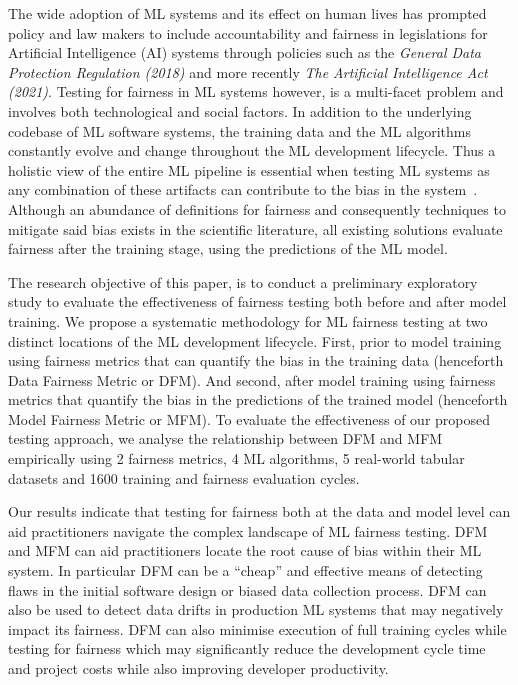 \documentclass{article}
\begin{document}
The wide adoption of ML systems and its effect on human lives has
prompted policy and law makers to include accountability and fairness
in legislations for Artificial Intelligence (AI) systems through
policies such as the \emph{General Data Protection Regulation (2018)}
and more recently \emph{The Artificial Intelligence Act
(2021)}. Testing for fairness in ML systems however, is a multi-facet
problem and involves both technological and social factors. In
addition to the underlying codebase of ML software systems, the
training data and the ML algorithms constantly evolve and change
throughout the ML development lifecycle. Thus a holistic view of the
entire ML pipeline is essential when testing ML systems as any
combination of these artifacts can contribute to the bias in the
system \cite{sculley2015hidden,bosch2021engineering,hutchinson2021towards,sato2019continuous}. Although
an abundance of definitions for fairness and consequently techniques
to mitigate said bias exists in the scientific literature, all
existing solutions evaluate fairness after the training stage, using
the predictions of the ML model.

The research objective of this paper, is to conduct a preliminary
exploratory study to evaluate the effectiveness of fairness testing
both before and after model training. We propose a systematic
methodology for ML fairness testing at two distinct locations of the
ML development lifecycle. First, prior to model training using
fairness metrics that can quantify the bias in the training data
(henceforth Data Fairness Metric or DFM). And second, after model
training using fairness metrics that quantify the bias in the
predictions of the trained model (henceforth Model Fairness Metric or
MFM). To evaluate the effectiveness of our proposed testing approach,
we analyse the relationship between DFM and MFM empirically using
2 fairness metrics, 4 ML algorithms, 5 real-world tabular datasets and
  1600 training and fairness evaluation cycles.

Our results indicate that testing for fairness both at the data and
model level can aid practitioners navigate the complex landscape of ML
fairness testing. DFM and MFM can aid practitioners locate the root
cause of bias within their ML system. In particular DFM can be
a ``cheap'' and effective means of detecting flaws in the initial
software design or biased data collection process. DFM can also be
used to detect data drifts in production ML systems that may
negatively impact its fairness. DFM can also minimise execution of
full training cycles while testing for fairness which may
significantly reduce the development cycle time and project costs
while also improving developer productivity.
\end{document}
